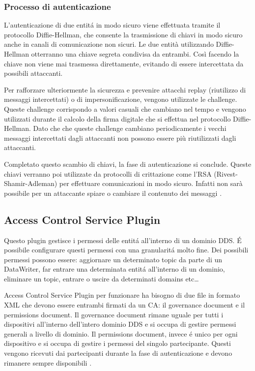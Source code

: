 \subsubsection{Processo di autenticazione}

L'autenticazione di due entitá in modo sicuro viene effettuata
tramite il protocollo Diffie-Hellman, che consente la trasmissione 
di chiavi in modo sicuro anche in canali di comunicazione non sicuri.
Le due entità utilizzando Diffie-Hellman otterranno una chiave 
segreta condivisa da entrambi. Così facendo la chiave non viene mai 
trasmessa direttamente, evitando di essere intercettata da 
possibili attaccanti. 

Per rafforzare ulteriormente la sicurezza e prevenire attacchi replay 
(riutilizzo di messaggi intercettati) o di impersonificazione, vengono 
utilizzate le challenge. Queste challenge corrispondo a valori 
casuali che cambiano nel tempo e vengono utilizzati durante il 
calcolo della firma digitale che si effettua nel protocollo
Diffie-Hellman.
Dato che che queste challenge cambiano periodicamente
i vecchi messaggi intercettati dagli attaccanti non possono essere 
più riutilizzati dagli attaccanti.

Completato questo scambio di chiavi, la fase di autenticazione si
conclude. Queste chiavi verranno poi utilizzate da protocolli di 
crittazione come l'RSA (Rivest-Shamir-Adleman) per effettuare 
comunicazioni in modo sicuro. Infatti non sarà possibile per un 
attaccante spiare o cambiare il contenuto dei messaggi 
\cite{DBLP:conf/asiaccs/WangLG24}.


\subsection{Access Control Service Plugin}
Questo plugin gestisce i permessi delle entitá all'interno di 
un dominio DDS. É possibile configurare questi permessi con una 
granularitá molto fine. Dei possibili permessi possono essere:
aggiornare un determinato topic da parte di 
un DataWriter, far entrare una determinata entitá
all'interno di un dominio, eliminare un topic, entrare o 
uscire da determinati domains etc\dots

Access Control Service Plugin per funzionare ha bisogno di due 
file in formato XML che devono essere entrambi firmati da 
un CA: il governance document e il permissions document.
Il governance document rimane uguale per tutti i dispositivi 
all'interno dell'intero dominio DDS e si occupa di gestire 
permessi generali a livello di dominio. Il permissions document,
invece é unico per ogni dispositivo e si occupa di gestire i 
permessi del singolo partecipante.
Questi vengono ricevuti dai partecipanti durante la fase di
autenticazione e devono rimanere sempre disponibili \cite{essay93639}.



